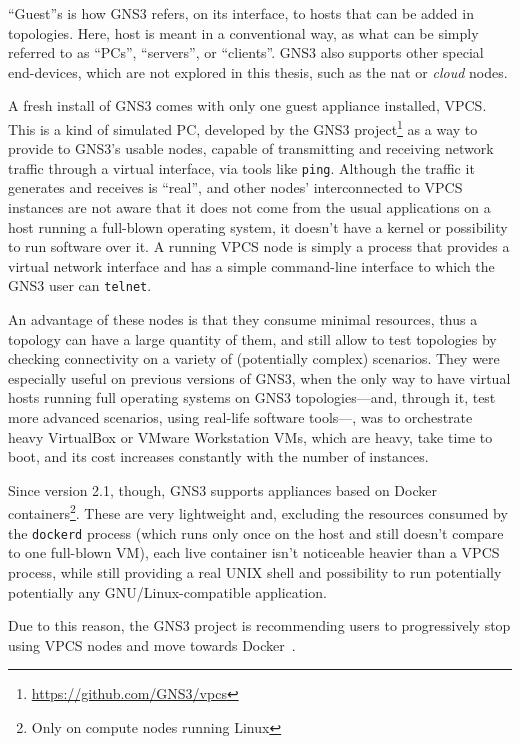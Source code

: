 ``Guest''s is how GNS3 refers, on its interface, to hosts that can be added in topologies.
Here, host is meant in a conventional way, as what can be simply referred to as ``PCs'', ``servers'', or ``clients''.
GNS3 also supports other special end-devices, which are not explored in this thesis, such as the \acrshort{nat} or \emph{cloud} nodes.

A fresh install of GNS3 comes with only one guest appliance installed, VPCS.
This is a kind of simulated PC, developed by the GNS3 project\footnote{\url{https://github.com/GNS3/vpcs}} as a way to provide to GNS3's usable nodes, capable of transmitting and receiving network traffic through a virtual interface, via tools like \texttt{ping}.
Although the traffic it generates and receives is ``real'', and other nodes' interconnected to VPCS instances are not aware that it does not come from the usual applications on a host running a full-blown operating system, it doesn't have a kernel or possibility to run software over it.
A running VPCS node is simply a process that provides a virtual network interface and has a simple command-line interface to which the GNS3 user can \texttt{telnet}.

An advantage of these nodes is that they consume minimal resources, thus a topology can have a large quantity of them, and still allow to test topologies by checking connectivity on a variety of (potentially complex) scenarios.
They were especially useful on previous versions of GNS3, when the only way to have virtual hosts running full operating systems on GNS3 topologies---and, through it, test more advanced scenarios, using real-life software tools---, was to orchestrate heavy VirtualBox or VMware Workstation VMs, which are heavy, take time to boot, and its cost increases constantly with the number of instances.

Since version 2.1, though, GNS3 supports appliances based on Docker containers\footnote{Only on compute nodes running Linux}.
These are very lightweight and, excluding the resources consumed by the \texttt{dockerd} process (which runs only once on the host and still doesn't compare to one full-blown VM), each live container isn't noticeable heavier than a VPCS process, while still providing a real UNIX shell and possibility to run potentially potentially any GNU/Linux-compatible application.  %

Due to this reason, the GNS3 project is recommending users to progressively stop using VPCS nodes and move towards Docker~\cite{ytdynamipsvpcs}.

